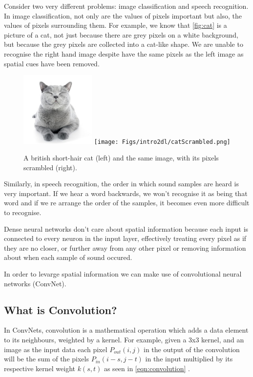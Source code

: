 Consider two very different problems: image classification and speech recognition. In image classification, not only are the values of pixels important but also, the values of pixels surrounding them. For example, we know that \autoref{fig:cat} is a picture of a cat, not just because there are grey pixels on a white background, but because the grey pixels are collected into a cat-like shape. We are unable to recognise the right hand image despite have the same pixels as the left image as spatial cues have been removed.

\begin{figure}
	\centering
	\includegraphics[width=0.33\textwidth]{Figs/intro2dl/cat.png}
	\texttt{[image: Figs/intro2dl/catScrambled.png]}
	
	\caption{A british short-hair cat (left) and the same image, with its pixels scrambled (right).}
	\label{fig:cat}
\end{figure}

Similarly, in speech recognition, the order in which sound samples are heard is very important. If we hear a word backwards, we won't recognise it as being that word and if we re arrange the order of the samples, it becomes even more difficult to recognise.

Dense neural networks don't care about spatial information because each input is connected to every neuron in the input layer, effectively treating every pixel as if they are no closer, or further away from any other pixel or removing information about when each sample of sound occured.

In order to levarge spatial information we can make use of convolutional neural networks (ConvNet).

\subsection{What is Convolution?}
In ConvNets, convolution is a mathematical operation which adds a data element to its neighbours, weighted by a kernel. For example, given a 3x3 kernel, and an image as the input data each pixel $P_{out}(i,j)$ in the output of the convolution will be the sum of the pixels $P_{in}(i-s, j-t)$ in the input  multiplied by its respective kernel weight $k(s,t)$ as seen in \autoref{eqn:convolution} \cite{dumoulin2016guide}.

